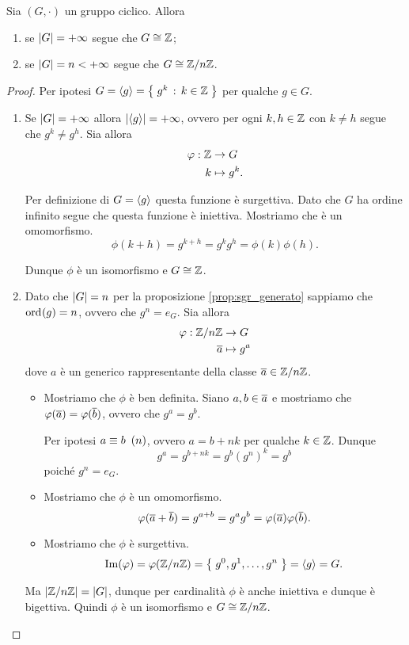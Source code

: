 \begin{theorem}
    \label{th:iso_ciclico}
    Sia $(G, \cdot)$ un gruppo ciclico. Allora \begin{enumerate}[label={(\roman*)}, ref={\thetheorem: (\roman*)}]
        \item se $\abs G = +\infty$ segue che $G \cong \Z$;
        \item se $\abs G = n < +\infty$ segue che $G \cong \Zmod n$.
    \end{enumerate}
\end{theorem}
\begin{proof}
    Per ipotesi $G = \cycl*{g} = \set{g^k \suchthat k \in \Z}$ per qualche $g \in G$.
    \begin{enumerate}[label={(\roman*)}]
        \item Se $\abs G = +\infty$ allora $\abs*{\cycl*{g}} = +\infty$, ovvero per ogni $k, h \in \Z$ con $k \neq h$ segue che $g^k \neq g^h$. Sia allora \begin{align*}
            \phi : \Z &\to G\\
            k &\mapsto g^k.
        \end{align*}

        Per definizione di $G = \cycl{g}$ questa funzione è surgettiva. Dato che $G$ ha ordine infinito segue che questa funzione è iniettiva. Mostriamo che è un omomorfismo. \[
            \phi(k + h) = g^{k + h} = g^kg^h = \phi(k)\phi(h).    
        \]

        Dunque $\phi$ è un isomorfismo e $G \cong \Z$.
        \item Dato che $\abs{G} = n$ per la proposizione \ref{prop:sgr_generato} sappiamo che $\ord g = n$, ovvero che $g^n = e_G$. Sia allora \begin{align*}
            \phi : \Zmod n &\to G\\
            \eqclass a &\mapsto g^a
        \end{align*} dove $a$ è un generico rappresentante della classe $\eqclass a \in \Zmod n$. \begin{itemize}
            \item Mostriamo che $\phi$ è ben definita. Siano $a, b \in \eqclass a$ e mostriamo che $\phi(\eqclass a) = \phi(\eqclass b)$, ovvero che $g^a = g^b$. 
            
            Per ipotesi $a \congr b \Mod{n}$, ovvero $a = b+nk$ per qualche $k \in \Z$. Dunque \[
                g^a = g^{b + nk} = g^b(g^n)^k = g^b    
            \] poiché $g^n = e_G$.
            \item Mostriamo che $\phi$ è un omomorfismo. \[
                \phi(\eqclass a + \eqclass b) = g^{a + b} = g^ag^b = \phi(\eqclass a)\phi(\eqclass b).
            \] \item Mostriamo che $\phi$ è surgettiva. \[
                \Im \phi = \phi(\Zmod n) = \set{g^0, g^1, \dots, g^n} = \cycl g = G.    
            \]
        \end{itemize}
        Ma $\abs*{\Zmod n} = \abs*{G}$, dunque per cardinalità $\phi$ è anche iniettiva e dunque è bigettiva. 
        Quindi $\phi$ è un isomorfismo e $G \cong \Zmod n$.
    \end{enumerate}
\end{proof}

